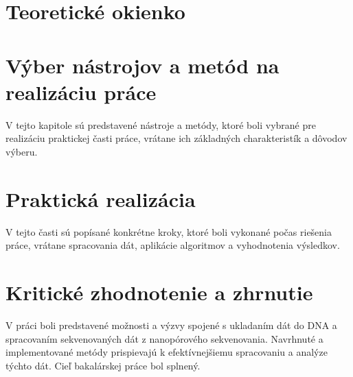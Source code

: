 \documentclass[12pt]{article}
\begin{document}
\section{Teoretické okienko}


\section{Výber nástrojov a metód na realizáciu práce}
V tejto kapitole sú predstavené nástroje a metódy, ktoré boli vybrané pre realizáciu praktickej časti práce, vrátane ich základných charakteristík a dôvodov výberu.






\section{Praktická realizácia}
V tejto časti sú popísané konkrétne kroky, ktoré boli vykonané počas riešenia práce, vrátane spracovania dát, aplikácie algoritmov a vyhodnotenia výsledkov.






\section{Kritické zhodnotenie a zhrnutie}
V práci boli predstavené možnosti a výzvy spojené s ukladaním dát do DNA a spracovaním sekvenovaných dát z nanopórového sekvenovania. Navrhnuté a implementované metódy prispievajú k efektívnejšiemu spracovaniu a analýze týchto dát. Cieľ bakalárskej práce bol splnený.


\newpage
\printbibliography[title={Použitá literatúra}]

%
\end{document}
